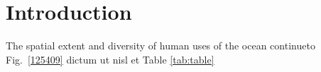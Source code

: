 \section{Introduction}
\label{introduction}

The spatial extent and diversity of human uses of the ocean continueto  Fig.~\ref{125409} dictum ut nisl et Table \ref{tab:table}
